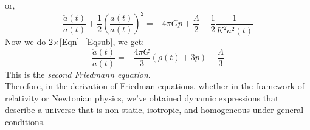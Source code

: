 \documentclass[12pt]{article}
\begin{document}
or,
\begin{equation}
\frac{\ddot{a}(t)}{a(t)}+\frac{1}{2}\left(\frac{\dot{a}(t)}{a(t)}\right)^{2}=-4 \pi G p+\frac{\Lambda}{2}-\frac{1}{2} \frac{1}{K^{2} a^{2}(t)}
\label{Eqn}
\end{equation}
Now we do 2$\times$\eqref{Eqn}- \eqref{Eqsub}, we get:
\begin{equation}
\frac{\ddot{a}(t)}{a(t)}=-\frac{4 \pi G}{3}(\rho(t)+3 p)+\frac{\Lambda}{3}
\end{equation}
This is the \textit{second Friedmann equation}.\\
Therefore, in the derivation of Friedman equations, whether in the framework of relativity or Newtonian physics, we've obtained dynamic expressions that describe a universe that is non-static, isotropic, and homogeneous under general conditions.
\end{document}
